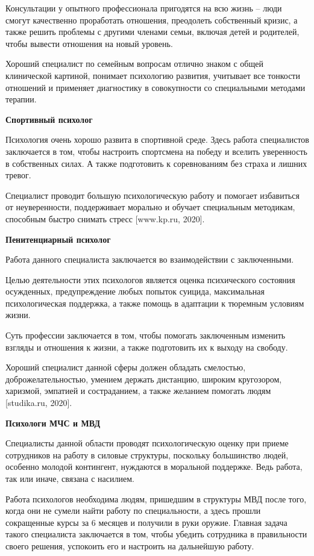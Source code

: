 Консультации у опытного профессионала пригодятся на всю жизнь – люди смогут качественно проработать отношения, преодолеть собственный кризис, а также решить проблемы с другими членами семьи, включая детей и родителей, чтобы вывести отношения на новый уровень.

Хороший специалист по семейным вопросам отлично знаком с общей клинической картиной, понимает психологию развития, учитывает все тонкости отношений и применяет диагностику в совокупности со специальными методами терапии.

\textbf{Спортивный психолог}

Психология очень хорошо развита в спортивной среде. Здесь работа специалистов заключается в том, чтобы настроить спортсмена на победу и вселить уверенность в собственных силах. А также подготовить к соревнованиям без страха и лишних тревог.

Специалист проводит большую психологическую работу и помогает избавиться от неуверенности, поддерживает морально и обучает специальным методикам, способным быстро снимать стресс [www.kp.ru, 2020].

\textbf{Пенитенциарный психолог}

Работа данного специалиста заключается во взаимодействии с заключенными.

Целью деятельности этих психологов является оценка психического состояния осужденных, предупреждение любых попыток суицида, максимальная психологическая поддержка, а также помощь в адаптации к тюремным условиям жизни.

Суть профессии заключается в том, чтобы помогать заключенным изменить взгляды и отношения к жизни, а также подготовить их к выходу на свободу.

Хороший специалист данной сферы должен обладать смелостью, доброжелательностью, умением держать дистанцию, широким кругозором, харизмой, эмпатией и состраданием, а также желанием помогать людям [studika.ru, 2020].

\textbf{Психологи МЧС и МВД}

Специалисты данной области проводят психологическую оценку при приеме сотрудников на работу в силовые структуры, поскольку большинство людей, особенно молодой контингент, нуждаются в моральной поддержке. Ведь работа, так или иначе, связана с насилием.

Работа психологов необходима людям, пришедшим в структуры МВД после того, когда они не сумели найти работу по специальности, а здесь прошли сокращенные курсы за 6 месяцев и получили в руки оружие. Главная задача такого специалиста заключается в том, чтобы убедить сотрудника в правильности своего решения, успокоить его и настроить на дальнейшую работу.

